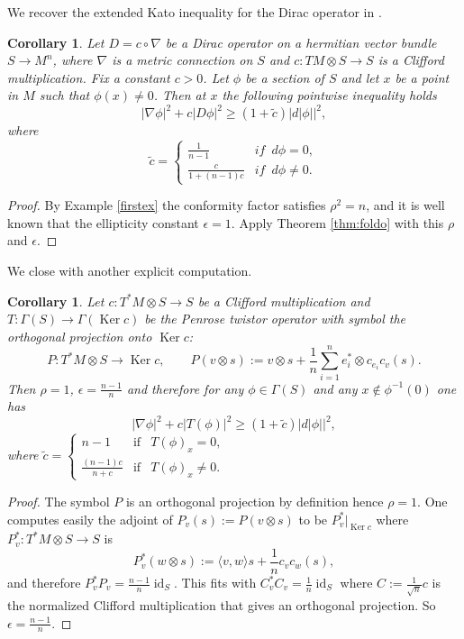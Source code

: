 \documentclass[12pt]{amsart} %
\newtheorem{corollary}[theorem]{Corollary}
\theoremstyle{definition}
\numberwithin{equation}{section}
\DeclareMathOperator{\Ker}{Ker}
\DeclareMathOperator{\id}{id}
\newcommand{\ra}{\rightarrow}
\begin{document}
We recover the extended Kato inequality for the Dirac operator in
\cite{CJS2014}.
\begin{corollary}
Let $D=c\circ\nabla$ be a Dirac operator on a hermitian vector bundle $S \ra M^n$, where $\nabla$ is a metric connection on $S$ and $c:TM\otimes S\to S$ is a Clifford multiplication. Fix a constant $c>0$. Let $\phi$ be a section of $S$ and let $x$ be a point in $M$ such that
$\phi (x) \neq0$. Then at $x$ the following pointwise inequality holds
\[
\left|\nabla\phi\right|^{2}+c\left|D\phi\right|^{2}\geq\left(1+\tilde{c}\right)\left|d\left|\phi\right|\right|^{2},
\]
where
\[
\tilde{c}=\begin{cases}
\frac{1}{n-1} & if\,\,\,d\phi=0,\\
\frac{c}{1+(n-1)c} & if\,\,\,d\phi\neq0.
\end{cases}
\]
\end{corollary}

\begin{proof}
By Example \ref{firstex} the conformity factor satisfies $\rho^2 = n$, and it is well known that the ellipticity constant $\epsilon = 1$. Apply Theorem \ref{thm:foldo} with this $\rho$ and $\epsilon$.
\end{proof}


We close with another explicit computation.
\begin{corollary} Let $c:T^ *M\otimes S\ra S$ be a Clifford multiplication and $T:\Gamma(S)\ra  \Gamma(\Ker c)$ be the Penrose twistor operator with symbol the orthogonal projection onto $\Ker c$:
\[P:T^ *M\otimes S\ra \Ker c,\qquad P(v\otimes s):= v\otimes s+\frac{1}{n}\sum_{i=1}^ ne_i^*\otimes c_{e_i} c_v(s) . \]
 Then $\rho=1$, $\epsilon=\frac{n-1}{n}$ and therefore for any $\phi\in\Gamma(S)$ and any $x\notin \phi^ {-1}(0)$ one has
\[|\nabla \phi|^ 2+c|T(\phi)|^ 2\geq (1+\tilde{c})|d|\phi||^2 , \]
where $\tilde{c}=\left\{\begin{array}{ccc}n-1 &\mbox{if} & T(\phi)_x=0 , \\
\frac{(n-1)c}{n+c} &\mbox{if} & T(\phi)_x\neq 0 .
\end{array}\right.$
\end{corollary}
\begin{proof} The symbol $P$ is an orthogonal projection by definition hence $\rho=1$. One computes easily the adjoint of $P_v(s):=P(v\otimes s)$ to be $P_v^*\bigr|_{\Ker c}$ where $P_v^*:T^*M\otimes S\ra S$ is
\[P_v^ *(w\otimes s):=\langle v,w\rangle s+\frac{1}{n}c_vc_w(s) , \]
and therefore $P_v^ *P_v=\frac{n-1}{n}\id_S$. This fits with $C_v^ *C_v=\frac{1}{n}\id_S$ where $C:=\frac{1}{\sqrt{n}}c$ is the normalized Clifford multiplication that gives an orthogonal projection.  So $\epsilon=\frac{n-1}{n}$.
\end{proof}
\end{document}
